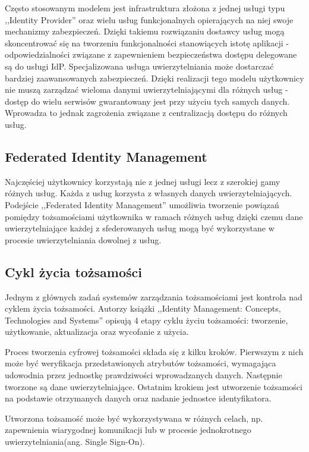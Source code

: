 		Często stosowanym modelem jest infrastruktura złożona z jednej usługi typu ,,Identity Provider'' oraz wielu usług funkcjonalnych opierających na niej swoje mechanizmy zabezpieczeń. Dzięki takiemu rozwiązaniu dostawcy usług mogą skoncentrować się na tworzeniu funkcjonalności stanowiących istotę aplikacji - odpowiedzialności związane z zapewnieniem bezpieczeństwa dostępu delegowane są do usługi IdP. Specjalizowana usługa uwierzytelniania może dostarczać bardziej zaawansowanych zabezpieczeń. Dzięki realizacji tego modelu użytkownicy nie muszą zarządzać wieloma danymi uwierzytelniającymi dla różnych usług - dostęp do wielu serwisów gwarantowany jest przy użyciu tych samych danych. Wprowadza to jednak zagrożenia związane z centralizacją dostępu do różnych usług.

	\subsection{Federated Identity Management}

		Najczęściej użytkownicy korzystają nie z jednej usługi lecz z szerokiej gamy różnych usług. Każda z usług korzysta z własnych danych uwierzytelniających. Podejście ,,Federated Identity Management'' umożliwia tworzenie powiązań pomiędzy tożsamościami użytkownika w ramach różnych usług dzięki czemu dane uwierzytelniające każdej z sfederowanych usług mogą być wykorzystane w procesie uwierzytelniania dowolnej z usług.

	\subsection{Cykl życia tożsamości}

		Jednym z głównych zadań systemów zarządzania tożsamościami jest kontrola nad cyklem życia tożsamości. Autorzy książki ,,Identity Management: Concepts, Technologies and Systems'' opisują 4 etapy cyklu życiu tożsamości: tworzenie, użytkowanie, aktualizacja oraz wycofanie z użycia\cite{Bertino11}.

		Proces tworzenia cyfrowej tożsamości składa się z kilku kroków. Pierwszym z nich może być weryfikacja przedstawionych atrybutów tożsamości, wymagająca udowodnia przez jednostkę prawdziwości wprowadzanych danych. Następnie tworzone są dane uwierzytelniające. Ostatnim krokiem jest utworzenie tożsamości na podstawie otrzymanych danych oraz nadanie jednostce identyfikatora.

		Utworzona tożsamość może być wykorzystywana w różnych celach, np. zapewnienia wiarygodnej komunikacji lub w procesie jednokrotnego uwierzytelniania(ang. Single Sign-On).

